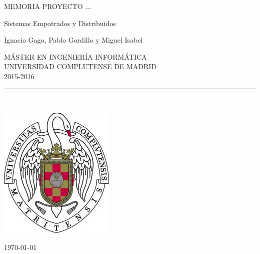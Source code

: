 \begin{center}

   \vspace{1cm}


   {\Large MEMORIA PROYECTO ...}\\

   \vspace{0.5cm}

   {\Large Sistemas Empotrados y Distribuidos }\\

   \vspace{0.5cm}




   {\large Ignacio Gago, Pablo Gordillo y Miguel Isabel}\\

   \vspace{0.5cm}




   M\'ASTER EN INGENIER\'IA INFORM\'ATICA\\
   UNIVERSIDAD COMPLUTENSE DE MADRID \\
   2015-2016\\


   \vspace{0.65cm}
   \rule{2in}{0.5pt}\\
   \vspace{0.85cm}

  \includegraphics[height=2.5in]{escudo.jpg}
  

   \vspace{0.5cm}


   \vspace{0.5cm}






   \today \\
   \vspace{1cm}

\end{center}

